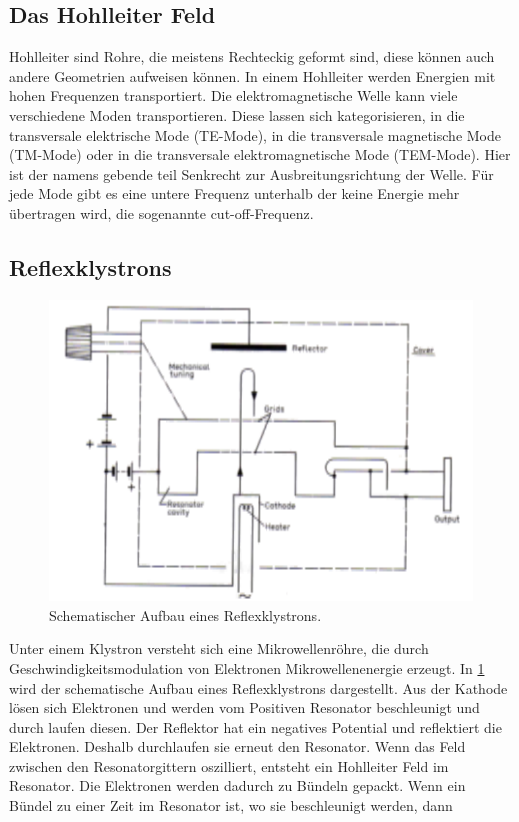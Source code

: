 \subsection{Das Hohlleiter Feld}
Hohlleiter sind Rohre, die meistens Rechteckig geformt sind, diese können auch andere Geometrien aufweisen können. In einem Hohlleiter werden Energien mit hohen Frequenzen transportiert. Die elektromagnetische Welle kann viele verschiedene Moden transportieren. Diese lassen sich kategorisieren, in die transversale elektrische Mode (TE-Mode), in die transversale magnetische Mode (TM-Mode) oder in die transversale elektromagnetische Mode (TEM-Mode). Hier ist der namens gebende teil Senkrecht zur Ausbreitungsrichtung der Welle. Für jede Mode gibt es eine untere Frequenz unterhalb der keine Energie mehr übertragen wird, die sogenannte cut-off-Frequenz.

\subsection{Reflexklystrons}
\begin{figure}[h!]
\centering
	\includegraphics[angle = 1 , scale = 0.8]{../Grafiken/Klystron_Schema3.pdf}
	\caption{Schematischer Aufbau eines Reflexklystrons.\cite{V53}}\label{fig:RefKlystron}
\end{figure}
Unter einem Klystron versteht sich eine Mikrowellenröhre, die durch Geschwindigkeitsmodulation von Elektronen Mikrowellenenergie erzeugt. In \cref{fig:RefKlystron} wird der schematische Aufbau eines Reflexklystrons dargestellt. Aus der Kathode lösen sich Elektronen und werden vom Positiven Resonator beschleunigt und durch laufen diesen. Der Reflektor hat ein negatives Potential und reflektiert die Elektronen. Deshalb durchlaufen sie erneut den Resonator. Wenn das Feld zwischen den Resonatorgittern oszilliert, entsteht ein Hohlleiter Feld im Resonator. Die Elektronen werden dadurch zu Bündeln gepackt. Wenn ein Bündel zu einer Zeit im Resonator ist, wo sie beschleunigt werden, dann 